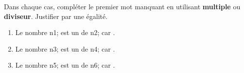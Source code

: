 \documentclass[exercice]{thedocument}%
\begin{document}
%
Dans chaque cas, compléter le premier mot manquant en utilisant {\bfseries multiple} ou {\bfseries diviseur}. Justifier par
une égalité.
\begin{enumerate}
    \item Le nombre \<n1; est un \doted{80pt} de \<n2; car \doted{60pt}.
    \item Le nombre \<n3; est un \doted{80pt} de \<n4; car \doted{60pt}.
    \item Le nombre \<n5; est un \doted{80pt} de \<n6; car \doted{60pt}.
\end{enumerate}
\end{document}
